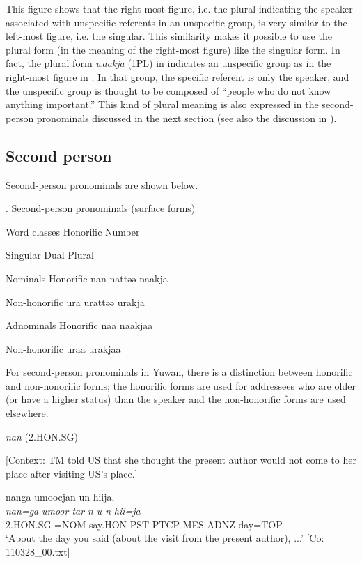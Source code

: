 This figure shows that the right-most figure, i.e. the plural indicating the speaker associated with unspecific referents in an unspecific group, is very similar to the left-most figure, i.e. the singular. This similarity makes it possible to use the plural form (in the meaning of the right-most figure) like the singular form. In fact, the plural form \textit{waakja} (1PL) in  indicates an unspecific group as in the right-most figure in . In that group, the specific referent is only the speaker, and the unspecific group is thought to be composed of “people who do not know anything important.” This kind of plural meaning is also expressed in the second-person pronominals discussed in the next section (see also the discussion in ).

\subsection{Second person}

Second-person pronominals are shown below.

\begin{styleBeschriftung}
\textmd{. Second-person pronominals (surface forms)}
\end{styleBeschriftung}

Word classes  Honorific  Number

    Singular  Dual  Plural

Nominals  Honorific  nan  nattəə  naakja

  Non-honorific  ura  urattəə  urakja

Adnominals  Honorific  naa  naakjaa

  Non-honorific  uraa  urakjaa

For second-person pronominals in Yuwan, there is a distinction between honorific and non-honorific forms; the honorific forms are used for addressees who are older (or have a higher status) than the speaker and the non-honorific forms are used elsewhere.

\ea \label{ex:5:9}  \ea \label{ex:5:9a} \textit{nan} (2.HON.SG)

    [Context: TM told US that she thought the present author would not come to her place after visiting US’s place.]

\glll  nanga  umoocjan  un  hiija,\\
\textit{nan=ga}  \textit{umoor-tar-n}  \textit{u-n}  \textit{hii=ja}\\
2.HON.SG =NOM  say.HON-PST-PTCP  MES-ADNZ  day=TOP\\
\glt ‘About the day you said (about the visit from the present author), ...’ [Co: 110328\_00.txt]


